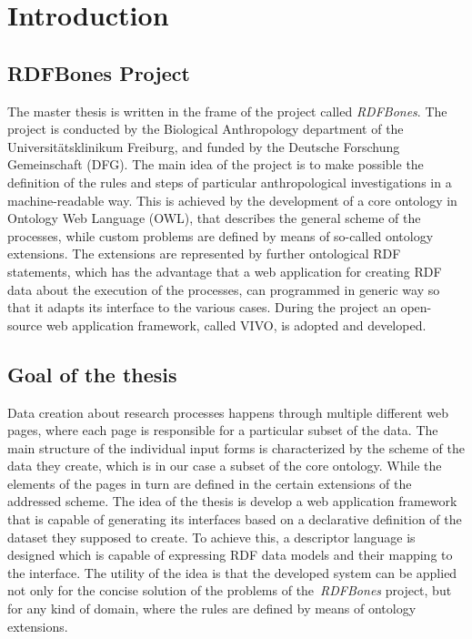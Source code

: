 \chapter{Introduction}


\section{RDFBones Project}

The master thesis is written in the frame of the project called \textit{RDFBones}. The project is conducted by the Biological Anthropology department of the Universitätsklinikum Freiburg, and funded by the Deutsche Forschung Gemeinschaft (DFG). The main idea of the project is to make possible the definition of the rules and steps of particular anthropological investigations in a machine-readable way. This is achieved by the development of a core ontology in Ontology Web Language (OWL), that describes the general scheme of the processes, while custom problems are defined by means of so-called ontology extensions. The extensions are represented by further ontological RDF statements, which has the advantage that a web application for creating RDF data about the execution of the processes, can programmed in generic way so that it adapts its interface to the various cases. During the project an open-source web application framework, called VIVO, is adopted and developed.

\section{Goal of the thesis}

Data creation about research processes happens through multiple different web pages, where each page is responsible for a particular subset of the data. The main structure of the individual input forms is characterized by the scheme of the data they create, which is in our case a subset of the core ontology. While the elements of the pages in turn are defined in the certain extensions of the addressed scheme. The idea of the thesis is develop a web application framework that is capable of generating its interfaces based on a declarative definition of the dataset they supposed to create. To achieve this, a descriptor language is designed which is capable of expressing RDF data models  and their mapping to the interface. The utility of the idea is that the developed system can be applied not only for the concise solution of the problems of the \textit{RDFBones} project, but for any kind of domain, where the rules are defined by means of ontology extensions.

